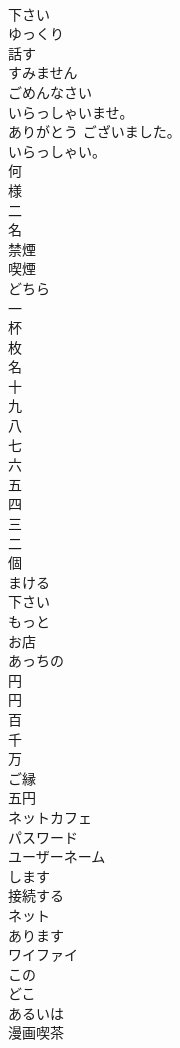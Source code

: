 \documentclass[8pt]{extreport}
\begin{document}
\begin{CJK}{UTF8}{min}
\\	下さい
\\	ゆっくり
\\	話す
\\	すみません
\\	ごめんなさい
\\	いらっしゃいませ。
\\	ありがとう ございました。
\\	いらっしゃい。
\\	何
\\	様
\\	二
\\	名
\\	禁煙
\\	喫煙
\\	どちら
\\	一
\\	杯
\\	枚
\\	名
\\	十
\\	九
\\	八
\\	七
\\	六
\\	五
\\	四
\\	三
\\	二
\\	個
\\	まける
\\	下さい
\\	もっと
\\	お店
\\	あっちの
\\	円
\\	円
\\	百
\\	千
\\	万
\\	ご縁
\\	五円
\\	ネットカフェ
\\	パスワード
\\	ユーザーネーム
\\	します
\\	接続する
\\	ネット
\\	あります
\\	ワイファイ
\\	この
\\	どこ
\\	あるいは
\\	漫画喫茶

\end{CJK}
\end{document}
